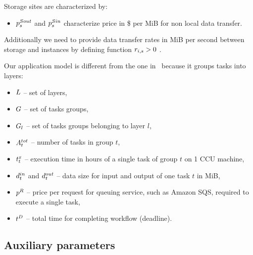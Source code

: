 {    Storage sites are characterized by:
    \begin{itemize}
        \item $p^{Sout}_s$ and $p^{Sin}_s$
        characterize price in \$ per MiB for non local data transfer.
    \end{itemize}
    
    Additionally we need to provide data transfer rates in MiB per second between
    storage and instances by defining function $r_{i,s} > 0$ .
    
  
    Our application model is different from the one in~\cite{Malawski-FGCS-13} because it groups tasks into layers:

    \begin{itemize}
        \item $L$  -- set of layers,
        \item $G$   -- set of tasks groups,
        \item $G_l$ -- set of tasks groups belonging to layer $l$, 
        \item $A^{tot}_t$ -- number of tasks in group $t$,
        \item $t^x_t$ -- execution time in hours of a single task of group $t$ on 1 CCU
        machine,
        \item $d^{in}_t$ and $d^{out}_t$ -- data size for input and
        output of one task $t$ in MiB,
        \item $p^{R}$ -- price per request for queuing service, such as Amazon SQS, required to execute a single task,
        \item $t^D$ -- total time for completing workflow (deadline).
    \end{itemize} 
    
    \subsection{Auxiliary parameters}
    \label{sec:workflow:problem:auxiliary}
    
}
